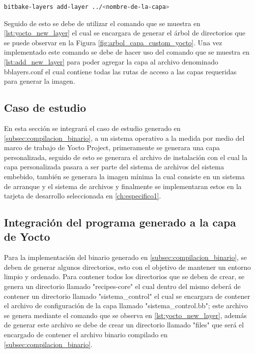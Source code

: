 \begin{lstlisting}[language=bash, caption={Agregar nueva capa, Yocto }, label=lst:add_new_layer]
    bitbake-layers add-layer ../<nombre-de-la-capa>
\end{lstlisting}

Seguido de esto se debe de utilizar el comando que se muestra en \ref{lst:yocto_new_layer} el cual se encargara de generar el árbol de directorios que se puede observar en la Figura \ref{fig:arbol_capa_custom_yocto}. Una vez implementado este comando se debe de hacer uso del comando que se muestra en \ref{lst:add_new_layer} para poder agregar la capa al archivo denominado bblayers.conf el cual contiene todas las rutas de acceso a las capas requeridas para generar la imagen.

\subsection{Caso de estudio}

En esta sección se integrará el caso de estudio generado en \ref{subsec:compilacion_binario}, a un sistema operativo a la medida por medio del marco de trabajo de Yocto Project, primeramente se generara una capa personalizada, seguido de esto se generara el archivo de instalación con el cual la capa personalizada pasara a ser parte del sistema de archivos del sistema embebido, también se generara la imagen mínima la cual consiste en un sistema de arranque y el sistema de archivos y finalmente se implementaran estos en la tarjeta de desarrollo seleccionada en \ref{ch:especifico1}.

\subsection{Integración del programa generado a la capa de Yocto}

Para la implementación del binario generado en \ref{subsec:compilacion_binario}, se deben de generar algunos directorios, esto con el objetivo de mantener un entorno limpio y ordenado. Para contener todos los directorios que se deben de crear, se genera un directorio llamado "recipes-core" el cual dentro del mismo deberá de contener un directorio llamado "sistema\_control" el cual se encargara de contener el archivo de configuración de la capa llamado "sistema\_control.bb"; este archivo se genera mediante el comando que se observa en \ref{lst:yocto_new_layer}, además de generar este archivo se debe de crear un directorio llamado "files" que será el encargado de contener el archivo binario compilado en \ref{subsec:compilacion_binario}.

